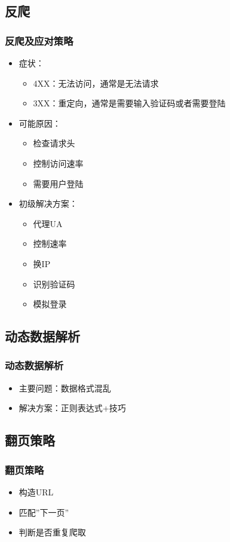 \documentclass{beamer}
\begin{document}
\subsection{反爬}
\begin{frame}[allowframebreaks]
\frametitle{反爬及应对策略}
\begin{itemize}
  \item 症状：
  \begin{itemize}
    \item 4XX：无法访问，通常是无法请求
    \item 3XX：重定向，通常是需要输入验证码或者需要登陆
  \end{itemize}
  \item 可能原因：
  \begin{itemize}
    \item 检查请求头
    \item 控制访问速率
    \item 需要用户登陆
  \end{itemize}
  \framebreak
  \item 初级解决方案：
  \begin{itemize}
    \item 代理UA
    \item 控制速率
    \item 换IP
    \item 识别验证码
    \item 模拟登录
  \end{itemize}
\end{itemize}
\end{frame}

\subsection{动态数据解析}
\begin{frame}
\frametitle{动态数据解析}
\begin{itemize}
  \item 主要问题：数据格式混乱
  \item 解决方案：正则表达式+技巧
\end{itemize}
\end{frame}

\subsection{翻页策略}
\begin{frame}
\frametitle{翻页策略}
\begin{itemize}
  \item 构造URL
  \item 匹配''下一页''
  \item 判断是否重复爬取
\end{itemize}
\end{frame}
\end{document}
